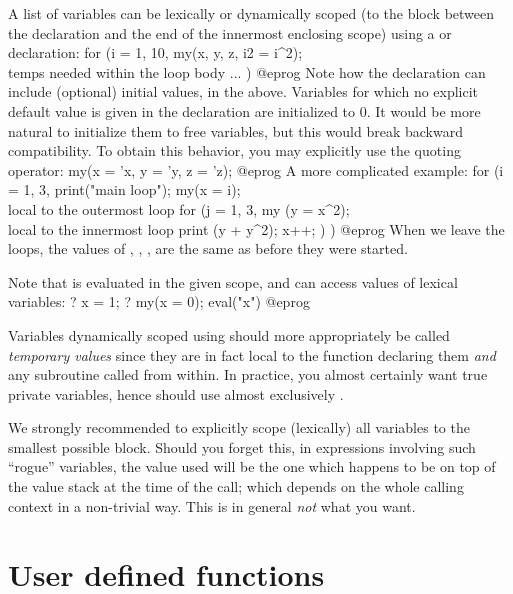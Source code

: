 A list of variables can be lexically or dynamically scoped (to the block
between the declaration and the end of the innermost enclosing scope) using a
 or  declaration:
\bprog
for (i = 1, 10,
  my(x, y, z, i2 = i^2); \\ temps needed within the loop body
  ...
)
@eprog\noindent
Note how the declaration can include (optional) initial values,  in the above. Variables for which no explicit default value is given
in the declaration are initialized to $0$. It would be more natural to
initialize them to free variables, but this would break backward
compatibility. To obtain this behavior, you may explicitly use the quoting
operator:
\bprog
my(x = 'x, y = 'y, z = 'z);
@eprog\noindent
A more complicated example:
\bprog
for (i = 1, 3,
  print("main loop");
  my(x = i);          \\ local to the outermost loop
  for (j = 1, 3,
    my (y = x^2);     \\ local to the innermost loop
    print (y + y^2);
    x++;
  )
)
@eprog\noindent
When we leave the loops, the values of , , , 
are the same as before they were started.

Note that  is evaluated in the given scope, and can access values
of lexical variables:
\bprog
? x = 1;
? my(x = 0); eval("x")
@eprog

Variables dynamically scoped using  should more appropriately be
called \emph{temporary values} since they are in fact local to the function
declaring them \emph{and} any subroutine called from within. In practice, you
almost certainly want true private variables, hence should use almost
exclusively .

We strongly recommended to explicitly scope (lexically) all variables to the
smallest possible block. Should you forget this, in expressions involving such
``rogue'' variables, the value used will be the one which happens to be on
top of the value stack at the time of the call; which depends on the whole
calling context in a non-trivial way. This is in general \emph{not} what you
want.

\section{User defined functions}
\label{se:user_defined}


